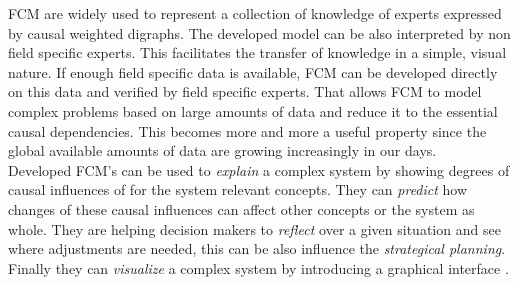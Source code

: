 \documentclass[conference]{IEEEtran}
\begin{document}
FCM are widely used to represent a collection of knowledge of experts expressed by causal weighted digraphs. The developed model can be also interpreted by non field specific experts. This facilitates the transfer of knowledge in a simple, visual nature. If enough field specific data is available, FCM can be developed directly on this data and verified by field specific experts. That allows FCM to model complex problems based on large amounts of data and reduce it to the essential causal dependencies. This becomes more and more a useful property since the global available amounts of data are growing increasingly in our days.\\
Developed FCM's can be used to \emph{explain} a complex system by showing degrees of causal influences of for the system relevant concepts. They can \emph{predict} how changes of these causal influences can affect other concepts or the system as whole. They are helping decision makers to \emph{reflect} over a given situation and see where adjustments are needed, this can be also influence the \emph{strategical planning}. Finally they can \emph{visualize} a complex system by introducing a graphical interface \cite{papageorgiou2013}.
\end{document}
